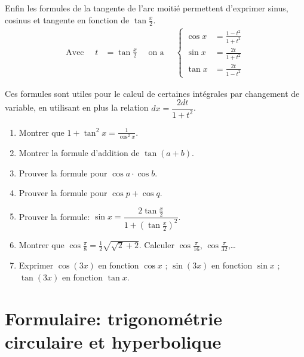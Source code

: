 \documentclass[class=report,crop=false]{standalone}
\begin{document}
Enfin les formules de la \og tangente de l'arc moitié\fg{} permettent d'exprimer sinus, cosinus et tangente
en fonction de $\tan \frac x2$.
\begin{align*}
\text{Avec }\quad  t&=\tan \frac{x}{2} \quad \text{ on a } \quad
\begin{cases}
    \cos x &= \frac {1-t^2}{1+t^2} \\
    \sin x &= \frac{2t}{1+t^2} \\
    \tan x &= \frac{2t}{1-t^2}
\end{cases}
\end{align*}

Ces formules sont utiles pour le calcul de certaines intégrales par changement de variable,
en utilisant en plus la relation $dx=\dfrac{2dt}{1+t^2}$.




\begin{miniexercices}
\sauteligne
\begin{enumerate}
  \item Montrer que $1+\tan^2x=\frac{1}{\cos^2x}$.
  \item Montrer la formule d'addition de $\tan(a+b)$.
  \item Prouver la formule pour $\cos a\cdot\cos b$.
  \item Prouver la formule pour $\cos p+\cos q$.
  \item Prouver la formule: $\sin x = \dfrac{2\tan \frac{x}{2}}{1+(\tan \frac{x}{2})^2}$.
  \item Montrer que $\cos \frac{\pi}{8}= \frac 12\sqrt{ \sqrt{2} + 2}$. Calculer $\cos \frac{\pi}{16}$,
$\cos \frac{\pi}{32}$,\ldots
  \item Exprimer $\cos(3x)$ en fonction $\cos x$ ; $\sin(3x)$ en fonction $\sin x$ ;
$\tan(3x)$ en fonction $\tan x$.
\end{enumerate}
\end{miniexercices}

\newpage
\section{Formulaire: trigonométrie circulaire et hyperbolique}
\end{document}
